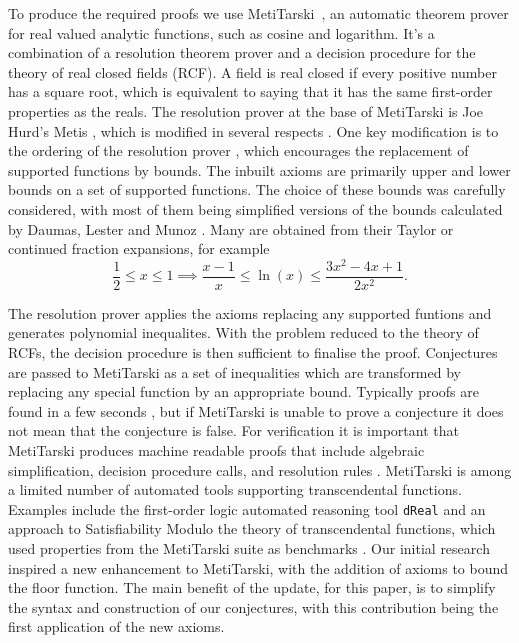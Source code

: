 \documentclass{fac}
\begin{document}
To produce the required proofs we use MetiTarski~\cite{akbarpour2010metitarski}, an automatic theorem prover for real valued analytic functions, such as cosine and logarithm. It's a combination of a resolution theorem prover and a decision procedure for the theory of real closed fields (RCF). A field is real closed if every positive number has a square root, which is equivalent to saying that it has the same first-order properties as the reals. The resolution prover at the base of MetiTarski is Joe Hurd's Metis \cite{metis_theorem_prover}, which is modified in several respects \cite{akbarpour2008metitarski}. One key modification is to the ordering of the resolution prover \cite{ludwig2007extension}, which encourages the replacement of supported functions by bounds. The inbuilt axioms are primarily upper and lower bounds on a set of supported functions. The choice of these bounds was carefully considered, with most of them being simplified versions of the bounds calculated by Daumas, Lester and Munoz \cite{daumas2008verified}. Many are obtained from their Taylor or continued fraction expansions, for example
\[\frac{1}{2} \leq x \leq 1 \implies \frac{x-1}{x} \leq \ln(x) \leq \frac{3x^2-4x+1}{2x^2}.\]

The resolution prover applies the axioms replacing any supported funtions and generates polynomial inequalites. With the problem reduced to the theory of RCFs, the decision procedure is then sufficient to finalise the proof. Conjectures are passed to MetiTarski as a set of inequalities which are transformed by replacing any special function by an appropriate bound. Typically proofs are found in a few seconds \cite{akbarpour2009applications}, but if MetiTarski is unable to prove a conjecture it does not mean that the conjecture is false. For verification it is important that MetiTarski produces machine readable proofs that include algebraic simplification, decision procedure calls, and resolution rules \cite{denman2009formal}. MetiTarski is among a limited number of automated tools supporting transcendental functions. Examples include the first-order logic automated reasoning tool \texttt{dReal} \cite{gao2013dreal} and an approach to Satisfiability Modulo the theory of transcendental functions, which used properties from the MetiTarski suite as benchmarks \cite{cimatti2017satisfiability}. Our initial research inspired a new enhancement to MetiTarski, with the addition of axioms to bound the floor function. The main benefit of the update, for this paper, is to simplify the syntax and construction of our conjectures, with this contribution being the first application of the new axioms.
\end{document}

